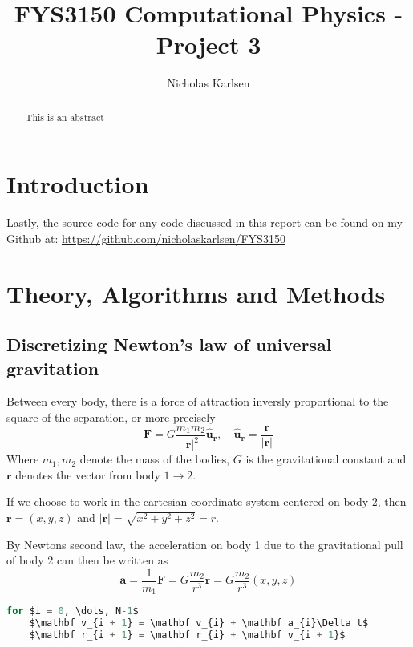 \documentclass[10pt,showpacs,preprintnumbers,footinbib,amsmath,amssymb,aps,prl,twocolumn,groupedaddress,superscriptaddress,showkeys]{revtex4-1}
\begin{document}
\title{FYS3150 Computational Physics - Project 3}
\author{Nicholas Karlsen}

\begin{abstract}
This is an abstract
\end{abstract}

\maketitle

\section{Introduction}
  
  Lastly, the source code for any code discussed in this report can be found on my
  Github at: \url{https://github.com/nicholaskarlsen/FYS3150}

\section{Theory, Algorithms and Methods}
  
  \subsection{Discretizing Newton's law of universal gravitation}
    Between every body, there is a force of attraction inversly proportional to the square of the separation, or more precisely
    \begin{equation}
      \mathbf F = G\frac{m_1 m_2}{|\mathbf r|^2}\mathbf{\hat{u}_r}, \quad \mathbf{\hat{u}_r} = \frac{\mathbf r}{\mathbf |\mathbf r|}
    \end{equation}
    Where $m_1, m_2$ denote the mass of the bodies, $G$ is the gravitational constant and $\mathbf r$ denotes the vector from body $1\rightarrow 2$.

    If we choose to work in the cartesian coordinate system centered on body 2, then $\mathbf r = (x, y, z)$ and $|\mathbf r| = \sqrt{x^2 + y^2 + z^2} = r$.

    By Newtons second law, the acceleration on body 1 due to the gravitational pull of body 2 can then be written as
    \begin{equation}
      \mathbf a = \frac{1}{m_1}\mathbf F = G \frac{m_2}{r^3}\mathbf r = G\frac{m_2}{r^3}\left(x, y, z\right)
    \end{equation}




\begin{lstlisting}[mathescape=true, language=python, title=Euler-Cromer Algorithm]
for $i = 0, \dots, N-1$
    $\mathbf v_{i + 1} = \mathbf v_{i} + \mathbf a_{i}\Delta t$
    $\mathbf r_{i + 1} = \mathbf r_{i} + \mathbf v_{i + 1}$
\end{lstlisting}
\end{document}
